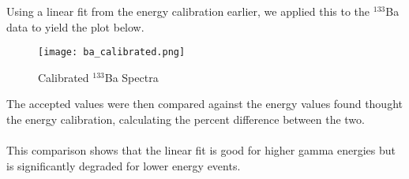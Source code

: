 
Using a linear fit from the energy calibration earlier, we applied this to the $^{133}$Ba data to yield the
plot below.

\begin{figure}[H]
  \begin{center}
    \texttt{[image: ba\_calibrated.png]}
    \caption{\label{fig:ba133}Calibrated $^{133}$Ba Spectra}
  \end{center}
\end{figure}

The accepted values were then compared against the energy values found thought the energy calibration, calculating the
percent difference between the two.
\\


\\

This comparison shows that the linear fit is good for higher gamma energies but is significantly
degraded for lower energy events.
